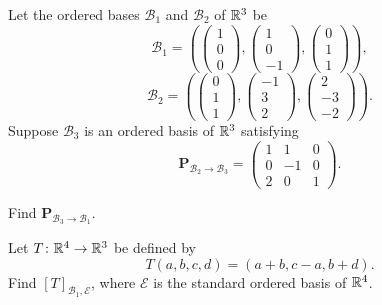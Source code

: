 \begin{problem}
Let the ordered bases $\mathcal B_1$ and $\mathcal B_2$ of $\mathbb{R}^3$ be
\[
\mathcal B_1=
\left(
\begin{pmatrix}1\\0\\0\end{pmatrix},
\begin{pmatrix}1\\0\\-1\end{pmatrix},
\begin{pmatrix}0\\1\\1\end{pmatrix}
\right),
\]
\[
\mathcal B_2=
\left(
\begin{pmatrix}0\\1\\1\end{pmatrix},
\begin{pmatrix}-1\\3\\2\end{pmatrix},
\begin{pmatrix}2\\-3\\-2\end{pmatrix}
\right).
\]
Suppose $\mathcal B_3$ is an ordered basis of $\mathbb{R}^3$ satisfying
\[
\mathbf P_{\mathcal B_2\to\mathcal B_3}=
\begin{pmatrix}
1&1&0\\
0&-1&0\\
2&0&1
\end{pmatrix}.
\]
\begin{problemsubparts}
\item Find $\mathbf P_{\mathcal B_3\to\mathcal B_1}$.
\item Let $T\colon\mathbb{R}^4\to\mathbb{R}^3$ be defined by
\[
T(a,b,c,d)=(a+b,c-a,b+d).
\]
Find $[T]_{\mathcal B_1,\mathcal E}$, where $\mathcal E$ is the standard ordered basis of $\mathbb{R}^4$.
\end{problemsubparts}
\end{problem}

